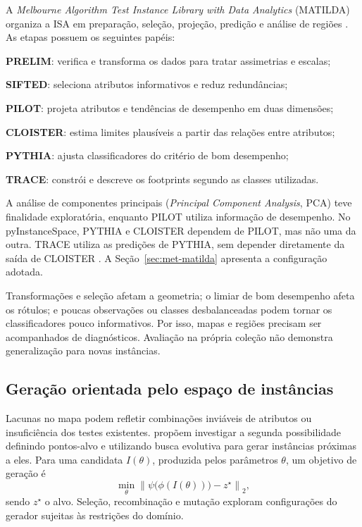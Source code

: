 A \textit{Melbourne Algorithm Test Instance Library with Data Analytics}
(MATILDA) organiza a ISA em preparação, seleção, projeção,
predição e análise de regiões \cite{SmithMilesMunoz2023}. As etapas
possuem os seguintes papéis:
\begin{alineas}
 \item \textbf{PRELIM}: verifica e transforma os dados para tratar assimetrias e escalas;
 \item \textbf{SIFTED}: seleciona atributos informativos e reduz redundâncias;
 \item \textbf{PILOT}: projeta atributos e tendências de desempenho em duas dimensões;
 \item \textbf{CLOISTER}: estima limites plausíveis a partir das relações entre atributos;
 \item \textbf{PYTHIA}: ajusta classificadores do critério de bom desempenho;
 \item \textbf{TRACE}: constrói e descreve os footprints segundo as classes utilizadas.
\end{alineas}

A análise de componentes principais (\textit{Principal Component Analysis},
PCA) teve finalidade exploratória, enquanto PILOT utiliza informação de
desempenho. No pyInstanceSpace, PYTHIA e CLOISTER dependem de PILOT,
mas não uma da outra. TRACE utiliza as predições de PYTHIA, sem depender
diretamente da saída de CLOISTER \cite{PyInstanceSpace021}.
A Seção~\ref{sec:met-matilda} apresenta a configuração adotada.

Transformações e seleção afetam a geometria; o limiar de bom desempenho
afeta os rótulos; e poucas observações ou classes desbalanceadas podem
tornar os classificadores pouco informativos. Por isso, mapas e regiões
precisam ser acompanhados de diagnósticos. Avaliação na própria coleção
não demonstra generalização para novas instâncias.

\subsection{Geração orientada pelo espaço de instâncias}

Lacunas no mapa podem refletir combinações inviáveis de atributos ou
insuficiência dos testes existentes. 
propõem investigar a segunda possibilidade definindo pontos-alvo e
utilizando busca evolutiva para gerar instâncias próximas a eles.
Para uma candidata $I(\theta)$, produzida pelos parâmetros $\theta$,
um objetivo de geração é
\begin{equation}
 \min_{\theta}\left\|\psi\bigl(\phi(I(\theta))\bigr)-z^{\star}\right\|_2,
 \label{eq:geracao-alvo-isa}
\end{equation}
\noindent sendo $z^{\star}$ o alvo. Seleção, recombinação e mutação
exploram configurações do gerador sujeitas às restrições do domínio.

